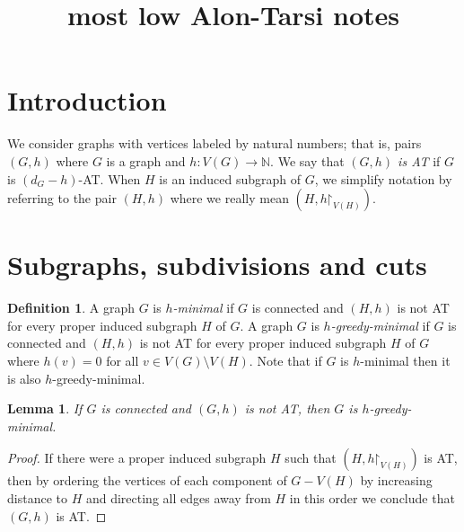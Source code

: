 \documentclass[12pt]{article}
\theoremstyle{plain}
\newtheorem{lem}[thm]{Lemma}
\theoremstyle{definition}
\newtheorem{defn}{Definition}
\theoremstyle{remark}
\newcommand{\IN}{\mathbb{N}}
\newcommand{\func}[3]{#1\colon #2 \rightarrow #3}
\newcommand{\parens}[1]{\left( #1 \right)}
\renewcommand{\restriction}{\mathord{\upharpoonright}}
\begin{document}
\title{most low Alon-Tarsi notes}
\author{}
\maketitle

\section{Introduction}

We consider graphs with vertices labeled by natural numbers; that is, pairs $(G,h)$ where $G$ is a graph and $\func{h}{V(G)}{\IN}$.  We say that \emph{$(G, h)$ is AT} if $G$ is $(d_G - h)$-AT.  When $H$ is an induced subgraph of $G$, we simplify notation by referring to the pair $(H, h)$ where we really mean $\parens{H, h\restriction_{V(H)}}$.

\section{Subgraphs, subdivisions and cuts}
\begin{defn}
	A graph $G$ is \emph{$h$-minimal} if $G$ is connected and $\parens{H, h}$ is not AT for every proper induced subgraph $H$ of $G$.
	A graph $G$ is \emph{$h$-greedy-minimal} if $G$ is connected and $\parens{H, h}$ is not AT for every proper induced subgraph $H$ of $G$ where $h(v) = 0$ for all $v \in V(G) \setminus V(H)$.	
	Note that if $G$ is $h$-minimal then it is also $h$-greedy-minimal.
\end{defn}

\begin{lem}\label{InducedSubgraph}
	If $G$ is connected and $(G,h)$ is not AT, then $G$ is $h$-greedy-minimal.
\end{lem}
\begin{proof}
	If there were a proper induced subgraph $H$ such that $\parens{H, h\restriction_{V(H)}}$ is AT, then by ordering the vertices of each component of $G - V(H)$ by increasing distance to $H$ and directing all edges away from $H$ in this order we conclude that $(G,h)$ is AT.
\end{proof}
\end{document}
